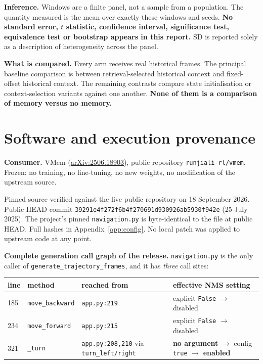 \documentclass[11pt,a4paper]{article}
\newcommand{\arxiv}[1]{\href{https://arxiv.org/abs/#1}{arXiv:#1}}
\newcommand{\code}[1]{\texttt{\small #1}}
\begin{document}
\textbf{Inference.} Windows are a finite panel, not a sample from a population. The quantity measured
is the mean over exactly these windows and seeds. \textbf{No standard error, $t$ statistic,
confidence interval, significance test, equivalence test or bootstrap appears in this report.} SD is
reported solely as a description of heterogeneity across the panel.

\textbf{What is compared.} Every arm receives real historical frames. The principal baseline
comparison is between retrieval-selected historical context and fixed-offset historical context. The
remaining contrasts compare state initialisation or context-selection variants against one another.
\textbf{None of them is a comparison of memory versus no memory.}

\section{Software and execution provenance}

\textbf{Consumer.} VMem (\arxiv{2506.18903}), public repository \code{runjiali-rl/vmem}. Frozen: no
training, no fine-tuning, no new weights, no modification of the upstream source.

Pinned source verified against the live public repository on 18 September 2026. Public HEAD commit
\code{39291e4f272f6b4f270691d930926ab5930f942e} (25 July 2025). The project's pinned
\code{navigation.py} is byte-identical to the file at public HEAD. Full hashes in
Appendix~\ref{app:config}. No local patch was applied to upstream code at any point.

\textbf{Complete generation call graph of the release.} \code{navigation.py} is the only caller of
\code{generate\_trajectory\_frames}, and it has \emph{three} call sites:

\begin{center}\small
\begin{tabular}{@{}llll@{}}
\toprule
line & method & reached from & effective NMS setting \\
\midrule
185 & \code{move\_backward} & \code{app.py:219} & explicit \code{False} $\to$ disabled \\
234 & \code{move\_forward}  & \code{app.py:215} & explicit \code{False} $\to$ disabled \\
321 & \code{\_turn} & \code{app.py:208,210} via \code{turn\_left/right} & \textbf{no argument} $\to$ config \code{true} $\to$ \textbf{enabled} \\
\bottomrule
\end{tabular}
\end{center}
\end{document}
